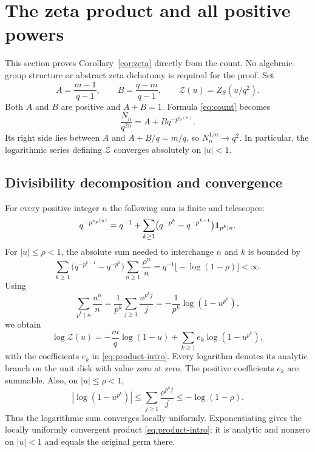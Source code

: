 \section{The zeta product and all positive powers}\label{sec:zeta}

This section proves Corollary~\ref{cor:zeta} directly from the count.
No algebraic-group structure or abstract zeta dichotomy is required for
the proof. Set
\[
 A=\frac{m-1}{q-1},\qquad B=\frac{q-m}{q-1},\qquad
 \mathcal Z(u)=Z_S(u/q^2).
\]
Both $A$ and $B$ are positive and $A+B=1$. Formula \eqref{eq:count}
becomes
\begin{equation}\label{eq:normalized}
 \frac{N_n}{q^{2n}}=A+Bq^{-p^{v_p(n)}}.
\end{equation}
Its right side lies between $A$ and $A+B/q=m/q$, so
$N_n^{1/n}\longrightarrow q^2$. In particular, the logarithmic series
defining $\mathcal Z$ converges absolutely on $|u|<1$.

\subsection{Divisibility decomposition and convergence}

For every positive integer $n$ the following sum is finite and telescopes:
\begin{equation}\label{eq:telescoping}
 q^{-p^{v_p(n)}}
 =q^{-1}+\sum_{k\ge1}
   \bigl(q^{-p^k}-q^{-p^{k-1}}\bigr)\mathbf 1_{p^k\mid n}.
\end{equation}
For $|u|\le\rho<1$, the absolute sum needed to interchange $n$ and
$k$ is bounded by
\[
 \sum_{k\ge1}\bigl(q^{-p^{k-1}}-q^{-p^k}\bigr)
     \sum_{n\ge1}\frac{\rho^n}{n}
 =q^{-1}\bigl[-\log(1-\rho)\bigr]<\infty.
\]
Using
\[
 \sum_{p^k\mid n}\frac{u^n}{n}
 =\frac1{p^k}\sum_{j\ge1}\frac{u^{p^k j}}j
 =-\frac1{p^k}\log(1-u^{p^k}),
\]
we obtain
\begin{equation}\label{eq:log-product}
 \log\mathcal Z(u)
 =-\frac mq\log(1-u)+\sum_{k\ge1}e_k\log(1-u^{p^k}),
\end{equation}
with the coefficients $e_k$ in \eqref{eq:product-intro}.
Every logarithm denotes its analytic branch on the unit disk with
value zero at zero. The positive coefficients $e_k$ are summable.
Also, on $|u|\le\rho<1$,
\[
 |\log(1-u^{p^k})|
 \le\sum_{j\ge1}\frac{\rho^{p^k j}}j
 \le-\log(1-\rho).
\]
Thus the logarithmic sum converges locally uniformly. Exponentiating
gives the locally uniformly convergent product
\eqref{eq:product-intro}; it is analytic and nonzero on $|u|<1$ and
equals the original germ there.

